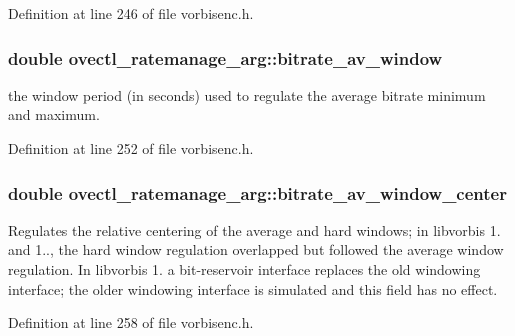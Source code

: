Definition at line 246 of file vorbisenc.\+h.

\subsubsection[{\texorpdfstring{bitrate\+\_\+av\+\_\+window}{bitrate_av_window}}]{\setlength{\rightskip}{0pt plus 5cm}double ovectl\+\_\+ratemanage\+\_\+arg\+::bitrate\+\_\+av\+\_\+window}\hypertarget{structovectl__ratemanage__arg_a1232e7296ae5e52f52039bed2560c505}{}\label{structovectl__ratemanage__arg_a1232e7296ae5e52f52039bed2560c505}
the window period (in seconds) used to regulate the average bitrate minimum and maximum. 

Definition at line 252 of file vorbisenc.\+h.

\subsubsection[{\texorpdfstring{bitrate\+\_\+av\+\_\+window\+\_\+center}{bitrate_av_window_center}}]{\setlength{\rightskip}{0pt plus 5cm}double ovectl\+\_\+ratemanage\+\_\+arg\+::bitrate\+\_\+av\+\_\+window\+\_\+center}\hypertarget{structovectl__ratemanage__arg_aad317d50fb4d072e2c55f0a60d1a83b2}{}\label{structovectl__ratemanage__arg_aad317d50fb4d072e2c55f0a60d1a83b2}
Regulates the relative centering of the average and hard windows; in libvorbis 1. and 1.., the hard window regulation overlapped but followed the average window regulation. In libvorbis 1. a bit-\/reservoir interface replaces the old windowing interface; the older windowing interface is simulated and this field has no effect. 

Definition at line 258 of file vorbisenc.\+h.

